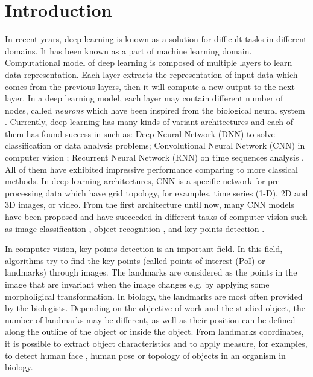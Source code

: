 \documentclass[review]{elsarticle}
\begin{document}
\linenumbers

\section{Introduction}
\label{sIntroduction}
In recent years, deep learning \cite{lecun2015deep} is known as a solution for difficult tasks in different domains. It has been known as a part of machine learning domain. Computational model of deep learning is composed of multiple layers to learn data representation. Each layer extracts the representation of input data which comes from the previous layers, then it will compute a new output to the next layer. In a deep learning model, each layer may contain different number of nodes, called \textit{neurons} which have been inspired from the biological neural system \cite{arbib2012brains}. Currently, deep learning has many kinds of variant architectures and each of them has found success in such as: Deep Neural Network (DNN) to solve classification or data analysis problems\cite{hinton2012deep, mikolov2011strategies}; Convolutional Neural Network (CNN) in computer vision \cite{lecun1998gradient, krizhevsky2012imagenet,szegedy2015going}; Recurrent Neural Network (RNN) on time sequences analysis \cite{jean2014using, sutskever2014sequence,lecun2015deep, collobert2011natural}. All of them have exhibited impressive performance comparing to more classical methods. In deep learning architectures, CNN is a specific network for pre-processing data which have grid topology, for examples, time series (1-D), 2D and 3D images, or video. From the first architecture \cite{lecun1998gradient} until now, many CNN models have been proposed and have succeeded in different tasks of computer vision such as image classification \cite{lecun1998gradient, krizhevsky2012imagenet,szegedy2015going}, object recognition \cite{szegedy2015going,farabet2013learning,li2015convolutional}, and key points detection \cite{liu2016fashion, sun2013deep, zhang2014facial, cintas2016automatic}.

In computer vision, key points detection is an important field. In this field, algorithms try to find the key points (called points of interest (PoI) or landmarks) through images. The landmarks are considered as the points in the image that are invariant when the image changes e.g. by applying some morpholigical transformation. In biology, the landmarks are most often provided by the biologists. Depending on the objective of work and the studied object, the number of landmarks may be different, as well as their position can be defined along the outline of the object or inside the object. From landmarks coordinates, it is possible to extract object characteristics and to apply measure, for examples, to detect human face \cite{sun2013deep}, human pose \cite{huang2017coarse} or topology of objects in an organism in biology.
\end{document}
